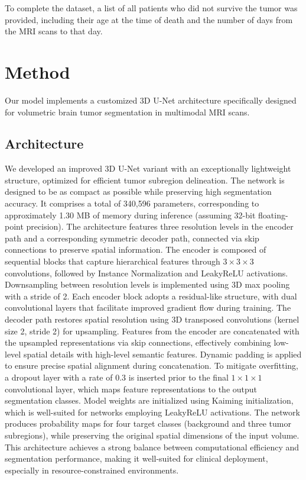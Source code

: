 \documentclass[10pt,twocolumn,letterpaper]{article}
\begin{document}
To complete the dataset, a list of all patients who did not survive the tumor was provided, including their age at the time of death and the number of days from the MRI scans to that day.


\section{Method}
Our model implements a customized 3D U-Net architecture specifically designed for volumetric brain tumor segmentation in multimodal MRI scans.

\subsection{Architecture}
We developed an improved 3D U-Net variant with an exceptionally lightweight structure, optimized for efficient tumor subregion delineation. The network is designed to be as compact as possible while preserving high segmentation accuracy. It comprises a total of 340,596 parameters, corresponding to approximately 1.30 MB of memory during inference (assuming 32-bit floating-point precision).
The architecture features three resolution levels in the encoder path and a corresponding symmetric decoder path, connected via skip connections to preserve spatial information. The encoder is composed of sequential blocks that capture hierarchical features through $3\times3\times3$ convolutions, followed by Instance Normalization and LeakyReLU activations. Downsampling between resolution levels is implemented using 3D max pooling with a stride of 2.
Each encoder block adopts a residual-like structure, with dual convolutional layers that facilitate improved gradient flow during training. The decoder path restores spatial resolution using 3D transposed convolutions (kernel size 2, stride 2) for upsampling. Features from the encoder are concatenated with the upsampled representations via skip connections, effectively combining low-level spatial details with high-level semantic features. Dynamic padding is applied to ensure precise spatial alignment during concatenation.
To mitigate overfitting, a dropout layer with a rate of $0.3$ is inserted prior to the final $1\times1\times1$ convolutional layer, which maps feature representations to the output segmentation classes. Model weights are initialized using Kaiming initialization, which is well-suited for networks employing LeakyReLU activations.
The network produces probability maps for four target classes (background and three tumor subregions), while preserving the original spatial dimensions of the input volume. This architecture achieves a strong balance between computational efficiency and segmentation performance, making it well-suited for clinical deployment, especially in resource-constrained environments.
\end{document}
